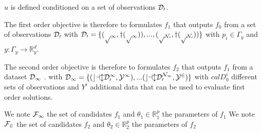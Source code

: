 \begin{bibunit}
{{   $u$ is defined 
  conditioned on a set of observations $\cal{D}_0$.

  The first order objective is therefore to formulates $f_1$ that outputs $f_0$ from  a set of observations $\cal{D}_0$
  with $\cal{D}_0 = \{(p_1, y(p_1)), ..., (p_{N_0}, y(p_{N_0})) \}$ with  $p_i \in \Gamma_y$ and $y: \Gamma_y \to \mathbb{R}^d_y$.

  The second order objective is therefore to formulates $f_2$ that outputs $f_1$ from a dataset $\cal{D}_1$ .
  with $\cal{D}_1 = \{(cal{D}_0^1, Y^1),... (cal{D}_0^{N_1}, Y^2) \}$ with  $cal{D}_0^{i}$ different sets of observations and $Y^i$ additional data that can be used to evaluate first order solutions.

  We note $\cal{F}_1$  the set of candidates $f_1$ and $\theta_1 \in \mathbb{R}^p_1$ the parameters of $f_1$
  We note $\cal{F}_2$  the set of candidates $f_2$ and $\theta_2 \in \mathbb{R}^p_2$ the parameters of $f_2$



}}
\end{bibunit}
